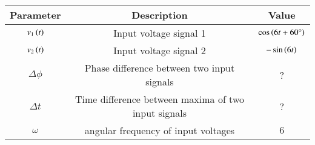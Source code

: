 \begin{tabular}{|c|c|c|}
    \hline
    \textbf{Parameter} & \textbf{Description} & \textbf{Value} \\
    \hline
    $v_1\left(t\right)$ & Input voltage signal 1 & $ \cos\left({6t+60\degree}\right)$\\
    \hline
    $v_2\left(t\right)$ & Input voltage signal 2 &$ -\sin\left({6t}\right)$ \\
    \hline
    $\Delta \phi$ & Phase difference between two input signals & ? \\
    \hline
    $\Delta t$ & Time difference between maxima of two input signals & ? \\
    \hline
    $\omega$ & angular frequency of input voltages& $ 6$\\
    \hline
\end{tabular}




